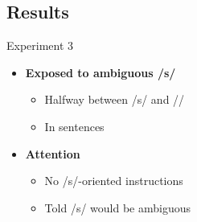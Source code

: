 \documentclass{beamer}
\begin{document}
\subsection{Results}

\begin{frame}{Experiment 3}

\begin{minipage}{0.45\textwidth}
\begin{itemize}
\item \textbf{Exposed to ambiguous /s/}
\begin{itemize}
\item Halfway between /s/ and /\textesh/
\item In sentences
\end{itemize}

\item \textbf{Attention}
\begin{itemize}
\item No /s/-oriented instructions
\item Told /s/ would be ambiguous
\end{itemize}


\end{itemize}
\end{minipage}
\end{frame}
\end{document}
